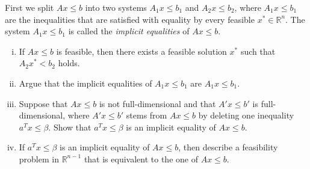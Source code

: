 \documentclass[11pt]{article}
\begin{document}
\begin{enumerate}[1)]
   First we split $Ax ≤ b$ into two systems $A_1x ≤ b_1$ and
   $A_2 x ≤ b_2$, where $A_1x ≤ b_1$ are the inequalities that are
   satisfied with equality by every feasible $x^* ∈ ℝ^n$. The system $A_1 x ≤b_1$ is
   called the \emph{implicit equalities} of $Ax ≤b$.
   \begin{enumerate}[i)] 
   \item If $Ax ≤b$ is feasible, then there exists a feasible solution $x^*$ such that $A_2x^* < b_2$ holds.
     \item Argue that the implicit equalities of $A_1x≤ b_1$ are  $A_1x ≤b_1$. 
   \item Suppose that $Ax ≤ b$ is not full-dimensional and that
     $A'x ≤ b'$ is full-dimensional, where $A'x ≤ b'$ stems from
     $Ax ≤ b$ by deleting one inequality $a^Tx ≤ β$. Show that
     $a^Tx ≤ β$ is an implicit equality of $Ax ≤b$.
   \item If $a^Tx ≤ β$ is an implicit equality of $Ax≤ b$, then describe a feasibility problem in $ℝ^{n-1}$ that is equivalent to the one of $Ax ≤b$. 
   \end{enumerate}
   
   






\end{enumerate}




  
\end{document}
